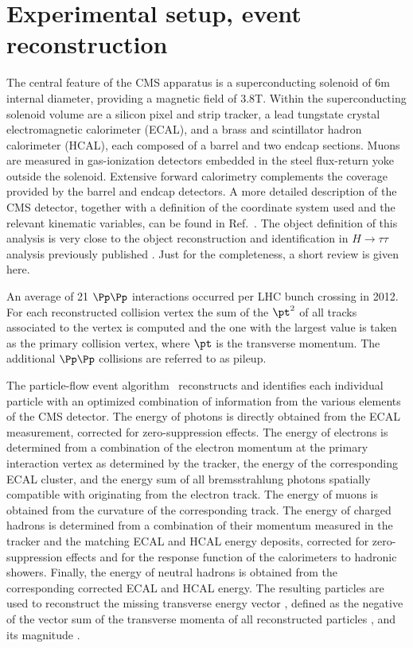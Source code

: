 \section{Experimental setup, event reconstruction}
\label{sect:CMSRec}


The central feature of the CMS apparatus is a superconducting solenoid of 6\unit{m} internal diameter, providing a magnetic field of 3.8\unit{T}. Within the superconducting solenoid volume are a silicon pixel and strip tracker, a lead tungstate crystal electromagnetic calorimeter (ECAL), and a brass and scintillator hadron calorimeter (HCAL), each composed of a barrel and two endcap sections. Muons are measured in gas-ionization detectors embedded in the steel flux-return yoke outside the solenoid. Extensive forward calorimetry complements the coverage provided by the barrel and endcap detectors. 
A more detailed description of the CMS detector, together with a definition of the coordinate system used and the relevant kinematic variables, can be found in Ref.~\cite{Chatrchyan:2008zzk}.
The object definition of this analysis is very close to the object reconstruction and identification in $H\to\tau\tau$ analysis previously published \cite{Khachatryan:2014wca}. Just for the completeness, a short review is given here. 


An average of 21 $\Pp\Pp$ interactions occurred per LHC bunch crossing in 2012.
For each reconstructed collision vertex the sum of the  $\pt^2$ of all tracks associated to the vertex is computed and the one with the largest value is taken as the primary collision vertex, where $\pt$ is the transverse momentum. The additional $\Pp\Pp$ collisions are referred to as pileup. 



The particle-flow event algorithm~\cite{CMS-PAS-PFT-09-001,CMS-PAS-PFT-10-001} reconstructs and identifies each individual particle with an optimized combination of information from the various elements of the CMS detector. The energy of photons is directly obtained from the ECAL measurement, corrected for zero-suppression effects. The energy of electrons is determined from a combination of the electron momentum at the primary interaction vertex as determined by the tracker, the energy of the corresponding ECAL cluster, and the energy sum of all bremsstrahlung photons spatially compatible with originating from the electron track. The energy of muons is obtained from the curvature of the corresponding track. The energy of charged hadrons is determined from a combination of their momentum measured in the tracker and the matching ECAL and HCAL energy deposits, corrected for zero-suppression effects and for the response function of the calorimeters to hadronic showers. Finally, the energy of neutral hadrons is obtained from the corresponding corrected ECAL and HCAL energy. 
The resulting particles are used to reconstruct the missing transverse energy vector \vecMET, defined as the negative of the vector sum of the transverse momenta of all reconstructed particles , and its magnitude \MET.

